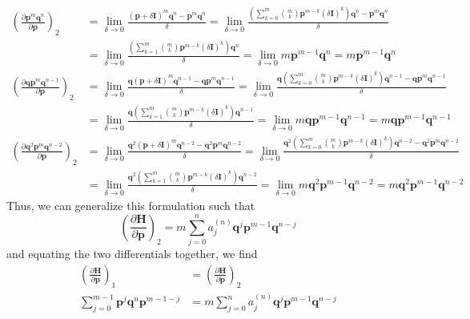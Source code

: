 \documentclass[a4paper]{article}
\theoremstyle{definition}
\begin{document}
		\begin{align}
			\left( \frac{\partial\textbf{p}^m\textbf{q}^n}{\partial\textbf{p}}\right)_2&=\lim_{\delta\to0}\frac{(\textbf{p}+\delta\textbf{I})^m\textbf{q}^n-\textbf{p}^m\textbf{q}^n}{\delta}=\lim_{\delta\to0}\frac{\left(	\displaystyle \sum_{k=0}^{m}\binom{m}{k}\textbf{p}^{m-k}(\delta\textbf{I})^k\right)\textbf{q}^n-\textbf{p}^m\textbf{q}^n}{\delta} \\
			&=\lim_{\delta\to0}\frac{\left(\displaystyle \sum_{k=1}^{m}\binom{m}{k}\textbf{p}^{m-k}(\delta\textbf{I})^k\right)\textbf{q}^n}{\delta}=\lim_{\delta\to0}m\textbf{p}^{m-1}\textbf{q}^n=m\textbf{p}^{m-1}\textbf{q}^n\\
			\left( \frac{\partial\textbf{q}\textbf{p}^m\textbf{q}^{n-1}}{\partial\textbf{p}}\right)_2&=\lim_{\delta\to0}\frac{\textbf{q}(\textbf{p}+\delta\textbf{I})^m\textbf{q}^{n-1}-\textbf{q}\textbf{p}^m\textbf{q}^{n-1}}{\delta}=\lim_{\delta\to0}\frac{\textbf{q}\left(	\displaystyle \sum_{k=0}^{m}\binom{m}{k}\textbf{p}^{m-k}(\delta\textbf{I})^k\right)\textbf{q}^{n-1}-\textbf{q}\textbf{p}^m\textbf{q}^{n-1}}{\delta} \\
			&=\lim_{\delta\to0}\frac{\textbf{q}\left(\displaystyle \sum_{k=1}^{m}\binom{m}{k}\textbf{p}^{m-k}(\delta\textbf{I})^k\right)\textbf{q}^{n-1}}{\delta}=\lim_{\delta\to0}m\textbf{q}\textbf{p}^{m-1}\textbf{q}^{n-1}=m\textbf{q}\textbf{p}^{m-1}\textbf{q}^{n-1} \\
			\left( \frac{\partial\textbf{q}^2\textbf{p}^m\textbf{q}^{n-2}}{\partial\textbf{p}}\right)_2&=\lim_{\delta\to0}\frac{\textbf{q}^2(\textbf{p}+\delta\textbf{I})^m\textbf{q}^{n-2}-\textbf{q}^2\textbf{p}^m\textbf{q}^{n-2}}{\delta}=\lim_{\delta\to0}\frac{\textbf{q}^2\left(	\displaystyle \sum_{k=0}^{m}\binom{m}{k}\textbf{p}^{m-k}(\delta\textbf{I})^k\right)\textbf{q}^{n-2}-\textbf{q}^2\textbf{p}^m\textbf{q}^{n-2}}{\delta} \\
			&=\lim_{\delta\to0}\frac{\textbf{q}^2\left(\displaystyle \sum_{k=1}^{m}\binom{m}{k}\textbf{p}^{m-k}(\delta\textbf{I})^k\right)\textbf{q}^{n-2}}{\delta}=\lim_{\delta\to0}m\textbf{q}^2\textbf{p}^{m-1}\textbf{q}^{n-2}=m\textbf{q}^2\textbf{p}^{m-1}\textbf{q}^{n-2}
		\end{align}
		Thus, we can generalize this formulation such that
		\begin{equation}
			\left( \frac{\partial\textbf{H}}{\partial\textbf{p}}\right)_2=m\sum_{j=0}^{n}a_j^{(n)}\textbf{q}^j\textbf{p}^{m-1}\textbf{q}^{n-j}
		\end{equation}
		and equating the two differentials together, we find
		\begin{align}
			\left( \frac{\partial\textbf{H}}{\partial\textbf{p}}\right)_1&=\left( \frac{\partial\textbf{H}}{\partial\textbf{p}}\right)_2\\
			\sum_{j=0}^{m-1}\textbf{p}^j\textbf{q}^n\textbf{p}^{m-1-j}&=m\sum_{j=0}^{n}a_j^{(n)}\textbf{q}^j\textbf{p}^{m-1}\textbf{q}^{n-j}\label{eqn:ref2}
		\end{align}
\end{document}
